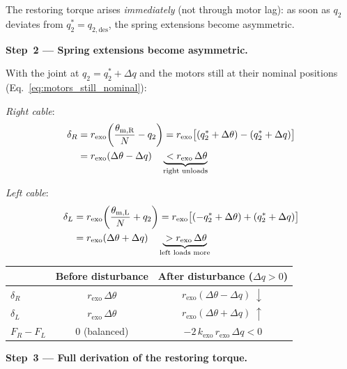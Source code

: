 \documentclass[11pt,a4paper]{article}
\begin{document}
The restoring torque arises \emph{immediately} (not through motor lag): as soon
as $q_2$ deviates from $q_2^* = q_{2,\mathrm{des}}$, the spring extensions
become asymmetric.

\bigskip
\textbf{Step~2 --- Spring extensions become asymmetric.}

With the joint at $q_2 = q_2^{*}+\Delta q$ and the motors still at their
nominal positions (Eq.~\ref{eq:motors_still_nominal}):

\medskip
\emph{Right cable}:
\begin{align}
    \delta_R
      &= r_{\mathrm{exo}}\!\left(\frac{\theta_{\mathrm{m,R}}}{N} - q_2\right)
       = r_{\mathrm{exo}}\bigl[(q_2^{*}+\Delta\theta)-(q_2^{*}+\Delta q)\bigr] \notag\\
      &= r_{\mathrm{exo}}(\Delta\theta - \Delta q)
       \quad \underbrace{\vphantom{X}< r_{\mathrm{exo}}\,\Delta\theta}_{\text{right unloads}}
    \label{eq:dist_deltaR}
\end{align}

\emph{Left cable}:
\begin{align}
    \delta_L
      &= r_{\mathrm{exo}}\!\left(\frac{\theta_{\mathrm{m,L}}}{N} + q_2\right)
       = r_{\mathrm{exo}}\bigl[(-q_2^{*}+\Delta\theta)+(q_2^{*}+\Delta q)\bigr] \notag\\
      &= r_{\mathrm{exo}}(\Delta\theta + \Delta q)
       \quad \underbrace{\vphantom{X}> r_{\mathrm{exo}}\,\Delta\theta}_{\text{left loads more}}
    \label{eq:dist_deltaL}
\end{align}

\begin{center}
\begin{tabular}{lcc}
\toprule
& \textbf{Before disturbance} & \textbf{After disturbance ($\Delta q > 0$)} \\
\midrule
$\delta_R$ & $r_{\mathrm{exo}}\,\Delta\theta$ & $r_{\mathrm{exo}}(\Delta\theta - \Delta q)\;\downarrow$ \\
$\delta_L$ & $r_{\mathrm{exo}}\,\Delta\theta$ & $r_{\mathrm{exo}}(\Delta\theta + \Delta q)\;\uparrow$ \\
$F_R - F_L$ & $0$ (balanced) & $-2\,k_{\mathrm{exo}}\,r_{\mathrm{exo}}\,\Delta q < 0$ \\
\bottomrule
\end{tabular}
\end{center}

\bigskip
\textbf{Step~3 --- Full derivation of the restoring torque.}
\end{document}

